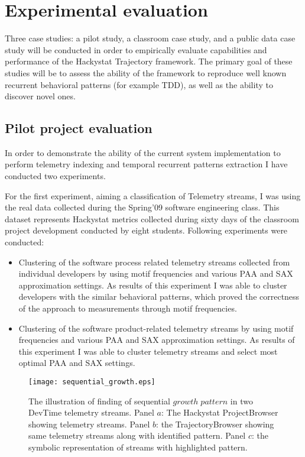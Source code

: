 \chapter{Experimental evaluation} \label{experiments}
Three case studies: a pilot study, a classroom case study, and a public data case study will be conducted in order to empirically evaluate capabilities and performance of the Hackystat Trajectory framework. The primary goal of these studies will be to assess the ability of the framework to reproduce well known recurrent behavioral patterns (for example TDD), as well as the ability to discover novel ones.

\section{Pilot project evaluation}
In order to demonstrate the ability of the current system implementation to perform telemetry indexing and temporal recurrent patterns extraction I have conducted two experiments. 

For the first experiment, aiming a classification of Telemetry streams, I was using the real data collected during the Spring'09 software engineering class. This dataset represents Hackystat metrics collected during sixty days of the classroom project development conducted by eight students. Following experiments were conducted:
\begin{itemize}
	\item Clustering of the software process related telemetry streams collected from individual developers by using motif frequencies and various PAA and SAX approximation settings. As results of this experiment I was able to cluster developers with the similar behavioral patterns, which proved the correctness of the approach to measurements through motif frequencies.
	\item Clustering of the software product-related telemetry streams by using motif frequencies and various PAA and SAX approximation settings. As results of this experiment I was able to cluster telemetry streams and select most optimal PAA and SAX settings.
\end{itemize}

\begin{figure}[tbp]
   \centering
   \texttt{[image: sequential\_growth.eps]}
   \caption{The illustration of finding of sequential $growth \; pattern$ in two DevTime telemetry streams. Panel $a$: The Hackystat ProjectBrowser showing telemetry streams. Panel $b$: the TrajectoryBrowser showing same telemetry streams along with identified pattern. Panel $c$: the symbolic representation of streams with highlighted pattern.}
   \label{fig:sequential_growth}
\end{figure}

